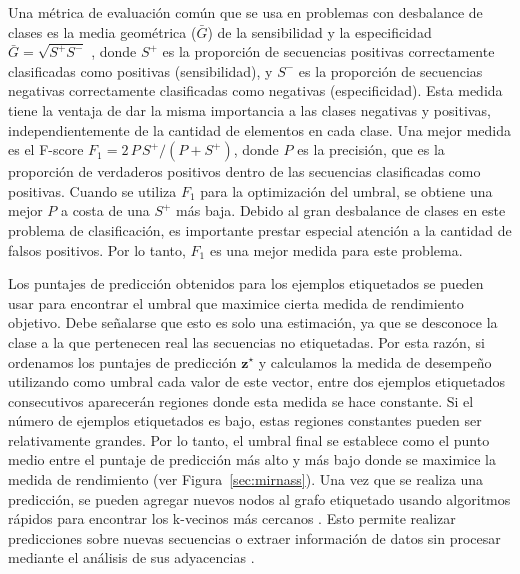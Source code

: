 Una métrica de evaluación común que se usa en problemas con desbalance de clases es la media geométrica ($ \bar {G} $) de la sensibilidad y la
especificidad $ \bar {G} = \sqrt {S ^ {+} S ^ {-} } $ \citep{batuwita2009micropred, gudys2013huntmi}, donde $ S ^ {+} $ es la proporción de secuencias
positivas correctamente clasificadas como positivas (sensibilidad), y $ S ^ {-} $ es la proporción de secuencias negativas correctamente clasificadas como
negativas (especificidad). Esta medida tiene la ventaja de dar la misma importancia a las clases negativas y positivas, independientemente de la cantidad de
elementos en cada clase. Una mejor medida es el \mbox{F-score} $ F_ {1} = 2 \, P \, S ^ {+} / (P + S ^ {+}) $, donde $ P $ es la precisión, que es la
proporción de verdaderos positivos dentro de las secuencias clasificadas como positivas. Cuando se utiliza $ F_ {1} $ para la optimización del umbral, se
obtiene una mejor $ P $ a costa de una $ S ^ {+} $ más baja. Debido al gran desbalance de clases en este problema de clasificación, es importante prestar
especial atención a la cantidad de falsos positivos. Por lo tanto, $F_{1}$ es una mejor medida para este problema.

Los puntajes de predicción obtenidos para los ejemplos etiquetados se pueden usar para encontrar el umbral que maximice cierta medida de rendimiento objetivo.
Debe señalarse que esto es solo una estimación, ya que se desconoce la clase a la que pertenecen real las secuencias no etiquetadas. Por esta razón, si
ordenamos los puntajes de predicción $ \mathbf {z} ^ \star $ y calculamos la medida de desempeño utilizando como umbral cada valor de este vector,  entre dos
ejemplos etiquetados consecutivos aparecerán regiones donde esta medida se hace constante. Si el número de ejemplos etiquetados es bajo, estas regiones
constantes pueden ser relativamente grandes. Por lo tanto, el umbral final se establece como el punto medio entre el puntaje de predicción más alto y más
bajo  donde se maximice la medida de rendimiento (ver Figura~\ref{sec:mirnass}). Una vez que se realiza una predicción, se pueden agregar nuevos
nodos al grafo etiquetado usando algoritmos rápidos para encontrar los k-vecinos más cercanos \citep{malkov2014approximate}. Esto permite realizar
predicciones sobre nuevas secuencias o extraer información de datos sin procesar mediante el análisis de sus adyacencias \citep{chapelle2006semi}.

